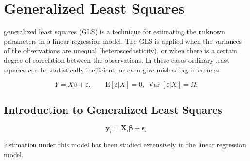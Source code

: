 \documentclass[Chap1main.tex]{subfiles}
\begin{document}
\section{Generalized Least Squares}


 generalized least squares (GLS) is a technique for estimating the unknown parameters in a linear regression model. 
 The GLS is applied when the variances of the observations are unequal (heteroscedasticity), or when there is a certain degree of correlation between the observations. 
 In these cases ordinary least squares can be statistically inefficient, or even give misleading inferences.
 
 
 
   \[ Y = X\beta + \varepsilon, \qquad \mathrm{E}[\varepsilon|X]=0,\ \operatorname{Var}[\varepsilon|X]=\Omega.\]
  


\subsection{Introduction to Generalized Least Squares}
 \begin{equation}
 \boldsymbol{y}_i = \boldsymbol{X}_i\boldsymbol{\beta} + \boldsymbol{\epsilon}_i
 \end{equation}

Estimation under this model has been studied extensively in the linear regression model.

\end{document}
